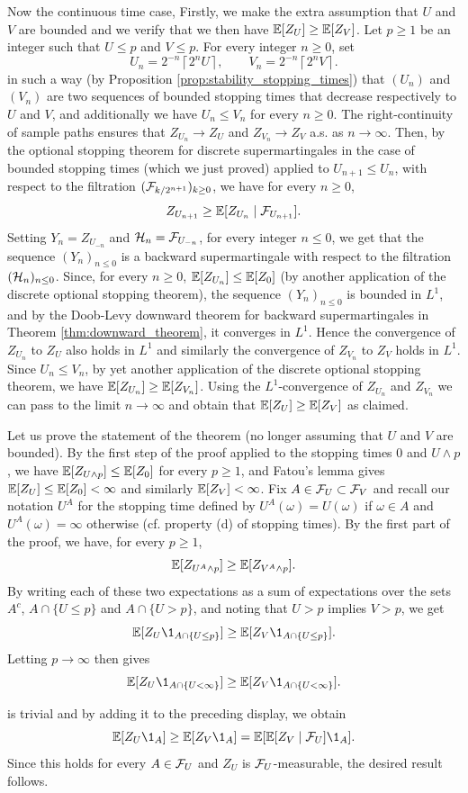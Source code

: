 \documentclass[../Main.tex]{subfiles}
\begin{document}
{    Now the continuous time case, Firstly, we make the extra assumption that $U$ and $V$ are bounded and we verify that we then have $\mathbb{E}[Z_U] \ge \mathbb{E}[Z_V]$. Let $p \ge 1$ be an integer such that $U \le p$ and $V \le p$. For every integer $n \ge 0$, set
    \[
    U_n = 2^{-n}\left\lceil 2^n U \right\rceil,
    \qquad
    V_n = 2^{-n}\left\lceil 2^n V \right\rceil.
    \]
    in such a way (by Proposition \ref{prop:stability_stopping_times}) that $(U_n)$ and $(V_n)$ are two sequences of bounded stopping times that decrease respectively to $U$ and $V$, and additionally we have $U_n \le V_n$ for every $n \ge 0$. The right-continuity of sample paths ensures that $Z_{U_n} \to Z_U$ and $Z_{V_n} \to Z_V$ a.s. as $n \to \infty$. 
    Then, by the optional stopping theorem for discrete supermartingales in the case of bounded stopping times (which we just proved) applied to $U_{n+1}\leq U_n$, with respect to the filtration $(\mathcal{F}_{k/2^{n+1}})_{k\ge0}$, we have for every $n \ge 0$,
    \[ Z_{U_{n+1}} \ge \mathbb{E}[Z_{U_n} \mid \mathcal{F}_{U_{n+1}}]. \]
    Setting $Y_n = Z_{U_{-n}}$ and $\mathcal{H}_n = \mathcal{F}_{U_{-n}}$, for every integer $n \le 0$, we get that the sequence $(Y_n)_{n\le0}$ is a backward supermartingale with respect to the filtration $(\mathcal{H}_n)_{n\le0}$. Since, for every $n \ge 0$, $\mathbb{E}[Z_{U_n}] \le \mathbb{E}[Z_0]$ (by another application of the discrete optional stopping theorem), the sequence $(Y_n)_{n\le0}$ is bounded in $L^1$, and by the Doob-Levy downward theorem for backward supermartingales in Theorem \ref{thm:downward_theorem}, it converges in $L^1$. Hence the convergence of $Z_{U_n}$ to $Z_U$ also holds in $L^1$ and similarly the convergence of $Z_{V_n}$ to $Z_V$ holds in $L^1$. Since $U_n \le V_n$, by yet another application of the discrete optional stopping theorem, we have $\mathbb{E}[Z_{U_n}] \ge \mathbb{E}[Z_{V_n}]$. Using the $L^1$-convergence of $Z_{U_n}$ and $Z_{V_n}$ we can pass to the limit $n \to \infty$ and obtain that $\mathbb{E}[Z_U] \ge \mathbb{E}[Z_V]$ as claimed.

    Let us prove the statement of the theorem (no longer assuming that $U$ and $V$ are bounded). By the first step of the proof applied to the stopping times $0$ and $U \wedge p$, we have $\mathbb{E}[Z_{U \wedge p}] \le \mathbb{E}[Z_0]$ for every $p \ge 1$, and Fatou's lemma gives $\mathbb{E}[Z_U] \le \mathbb{E}[Z_0] < \infty$ and similarly $\mathbb{E}[Z_V] < \infty$. Fix $A \in \mathcal{F}_U \subset \mathcal{F}_V$ and recall our notation $U^A$ for the stopping time defined by $U^A(\omega) = U(\omega)$ if $\omega \in A$ and $U^A(\omega) = \infty$ otherwise (cf. property (d) of stopping times). By the first part of the proof, we have, for every $p \ge 1$,
    \[ \mathbb{E}[Z_{U^A \wedge p}] \ge \mathbb{E}[Z_{V^A \wedge p}]. \]
    By writing each of these two expectations as a sum of expectations over the sets $A^c$, $A \cap \{U \le p\}$ and $A \cap \{U > p\}$, and noting that $U > p$ implies $V > p$, we get
    \[ \EE[Z_U \1_{A \cap \{U \le p\}}] \ge \EE[Z_V \1_{A \cap \{U \le p\}}]. \]
    Letting $p \to \infty$ then gives
    \[ \EE[Z_U \1_{A \cap \{U < \infty\}}] \ge \EE[Z_V \1_{A \cap \{U < \infty\}}]. \]

    is trivial and by adding it to the preceding display, we obtain
    \[ \EE[Z_U \1_A] \ge \EE[Z_V \1_A] = \EE[\EE[Z_V \mid \F_U] \1_A]. \]
    Since this holds for every $A \in \mathcal{F}_U$ and $Z_U$ is $\mathcal{F}_U$-measurable, the desired result follows.
}
\end{document}
